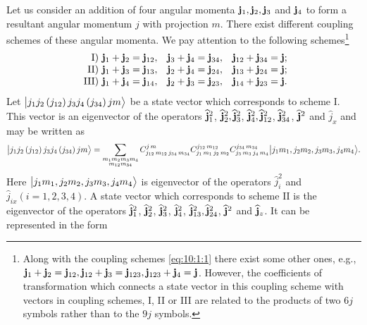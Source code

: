 Let us consider an addition of four angular momenta $\mathbf{j}_{1}, \mathbf{j}_{2}, \mathbf{j}_{3}$ and $\mathbf{j}_{4}$ to form a resultant angular momentum $j$ with projection $m$. There exist different coupling schemes of these angular momenta. We pay attention to the following schemes\footnote{Along with the coupling schemes \eqref{eq:10:1:1} there exist some other ones, e.g., $\mathbf{j}_{1}+\mathbf{j}_{2}=\mathbf{j}_{12}, \mathbf{j}_{12}+\mathbf{j}_{3}=\mathbf{j}_{123}, \mathbf{j}_{123}+\mathbf{j}_{4}=\mathbf{j}$. However, the coefficients of transformation which connects a state vector in this coupling scheme with vectors in coupling schemes, I, II or III are related to the products of two $6 j$ symbols rather than to the $9 j$ symbols.
}
\begin{equation}
\begin{array}{rll}
\text { I) } \mathbf{j}_{1}+\mathbf{j}_{2}=\mathbf{j}_{12}, & \mathbf{j}_{3}+\mathbf{j}_{4}=\mathbf{j}_{34}, & \mathbf{j}_{12}+\mathbf{j}_{34}=\mathbf{j} ; \\
\text { II) } \mathbf{j}_{1}+\mathbf{j}_{3}=\mathbf{j}_{13}, & \mathbf{j}_{2}+\mathbf{j}_{4}=\mathbf{j}_{24}, & \mathbf{j}_{13}+\mathbf{j}_{24}=\mathbf{j} ; \\
\text { III) } \mathbf{j}_{1}+\mathbf{j}_{4}=\mathbf{j}_{14}, & \mathbf{j}_{2}+\mathbf{j}_{3}=\mathbf{j}_{23}, & \mathbf{j}_{14}+\mathbf{j}_{23}=\mathbf{j} . \label{eq:10:1:1}
\end{array}
\end{equation}
Let $\bigl| j_{1} j_{2}\left(j_{12}\right) j_{3} j_{4}\left(j_{34}\right) j m \bigr\rangle$ be a state vector which corresponds to scheme I. This vector is an eigenvector of the operators $\widehat{\mathbf{j}}_{1}^{2}$, $\widehat{\mathbf{j}}_{2}^{2}, \widehat{\mathbf{j}}_{3}^{2}$, $\widehat{\mathbf{j}}_{4}^{2}, \widehat{\mathbf{j}}_{12}^{2}$, $\widehat{\mathbf{j}}_{34}^{2}$, $\widehat{\mathbf{j}}^{2}$ and $\widehat{j}_{x}$ and may be written as
\begin{equation}
\bigl| j_{1} j_{2}\left(j_{12}\right) j_{3} j_{4}\left(j_{34}\right) j m \bigr\rangle=\sum_{\substack{m_{1} m_{2} m_{3} m_{4} \\ m_{12} m_{34}}} C_{j_{12}\,m_{12}\,j_{34}\,m_{34}}^{j\,m} C_{j_{1}\,m_{1}\,j_{2}\,m_{2}}^{j_{12}\,m_{12}} C_{j_{3}\,m_{3}\,j_{4}\,m_{4}}^{j_{34}\,m_{34}}\bigl| j_{1} m_{1}, j_{2} m_{2}, j_{3} m_{3}, j_{4} m_{4} \bigr\rangle . \label{eq:10:1:2}
\end{equation}
Here $\bigl| j_{1} m_{1}, j_{2} m_{2}, j_{3} m_{3}, j_{4} m_{4} \bigr\rangle$ is eigenvector of the operators $\hat{j}_{i}^{2}$ and $\hat{j}_{i x}(i=1,2,3,4)$. A state vector which corresponds to scheme II is the eigenvector of the operators $\widehat{\mathbf{j}}_{1}^{2}$, $\widehat{\mathbf{j}}_{2}^{2}$, $\widehat{\mathbf{j}}_{3}^{2}$, $\widehat{\mathbf{j}}_{4}^{2}$, $\widehat{\mathbf{j}}_{13}^{2}, \widehat{\mathbf{j}}_{24}^{2}$, $\widehat{\mathbf{j}}^{2}$ and $\widehat{\mathbf{j}}_{z}$. It can be represented in the form
